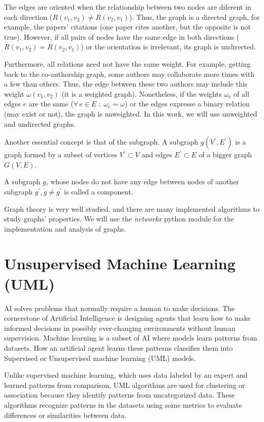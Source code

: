 \documentclass[a4paper,12pt]{report}
\begin{document}
The edges are oriented when the relationship between two nodes are diferent in each direction ($R(v_1, v_2) \neq R(v_2, v_1)$).
Thus, the graph is a directed graph, for example, the papers' citations (one paper cites another, but the opposite is not true).
However, if all pairs of nodes have the same edge in both directions ($ R(v_1, v_2) = R(v_2, v_1)$) or the orientation is irrelevant, its graph is undirected.

Furthermore, all relations need not have the same weight. For example, getting back to the co-authorship graph, some authors may collaborate more times with a few than others.
Thus, the edge between these two authors may include this weight $\omega(v_1, v_2)$ (it is a weighted graph).
Nonetheless, if the weights $\omega_e$ of all edges $e$ are the same ($\forall\, e\in E\; : \;\omega_e = \omega$) or the edges expresse a binary relation (may exist or not), the graph is unweighted.
In this work, we will use unweighted and undirected graphs.

Another essential concept is that of the subgraph.
A subgraph $g(V^\prime, E^\prime)$ is a graph formed by a subset of vertices $V^\prime \subset V$ and edges $E^\prime \subset E$ of a bigger graph $G(V, E)$.

A subgraph $g$, whose nodes do not have any edge between nodes of another subgraph $g^\prime, g \neq g^\prime$ is called a component.

Graph theory is very well studied, and there are many implemented algorithms to study graphs' properties.
We will use the \textit{networkx} python module for the implementation and analysis of graphs.



\section{Unsupervised Machine Learning (UML)}

AI solves problems that normally require a human to make decisions.
The cornerstone of Artificial Intelligence is designing agents that learn how to make informed decisions in possibly ever-changing environments without human supervision. Machine learning is a subset of AI where models learn patterns from datasets.
How an artificial agent learns these patterns classifies them into Supervised or Unsupervised machine learning (UML) models.

Unlike supervised machine learning, which uses data labeled by an expert and learned patterns from comparison, UML algorithms are used for clustering or association because they identify patterns from uncategorized data.
These algorithms recognize patterns in the datasets using some metrics to evaluate differences or similarities between data.
\end{document}
